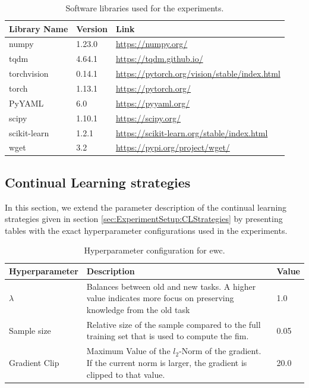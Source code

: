 \begin{table}[!htb]
    \centering
    \begin{tabular}{|l || l | l |} 
        \hline
        Library Name & Version & Link \\ 
        \hline 
        \hline
        numpy & 1.23.0 & \url{https://numpy.org/} \\
        \hline
        tqdm & 4.64.1 & \url{https://tqdm.github.io/}  \\
        \hline
        torchvision & 0.14.1 & \url{https://pytorch.org/vision/stable/index.html} \\ 
        \hline
        torch & 1.13.1 & \url{https://pytorch.org/} \\
        \hline
        PyYAML & 6.0 & \url{https://pyyaml.org/} \\
        \hline
        scipy & 1.10.1 & \url{https://scipy.org/} \\
        \hline
        scikit-learn & 1.2.1 & \url{https://scikit-learn.org/stable/index.html} \\
        \hline
        wget & 3.2 & \url{https://pypi.org/project/wget/} \\
        \hline
    \end{tabular}
    \caption{Software libraries used for the experiments.}
    \label{fig:Libraries}
\end{table}

\subsection{Continual Learning strategies}
\label{sec:Appendix:CLStrategies}
In this section, we extend the parameter description of the continual learning strategies given in section 
\ref{sec:ExperimentSetup:CLStrategies} by presenting tables with the exact hyperparameter configurations
used in the experiments.

\begin{table}[!htb]
    \begin{tabularx}{\textwidth}{|l | X | l |} 
        \hline
        Hyperparameter & Description & Value \\ 
        \hline 
        \hline
        $\lambda$ & Balances between old and new tasks. A higher value indicates more focus 
        on preserving knowledge from the old task & 1.0  \\ 
        \hline
        Sample size & Relative size of the sample compared to the full training set that is used to 
        compute the \gls{fim}. & 0.05  \\ 
        \hline
        Gradient Clip & Maximum Value of the $l_2$-Norm of the gradient. If the current norm is larger,
        the gradient is clipped to that value. & 20.0 \\ 
        \hline
    \end{tabularx}
    \caption{Hyperparameter configuration for \gls{ewc}.}
    \label{fig:EWCparams}
\end{table}

